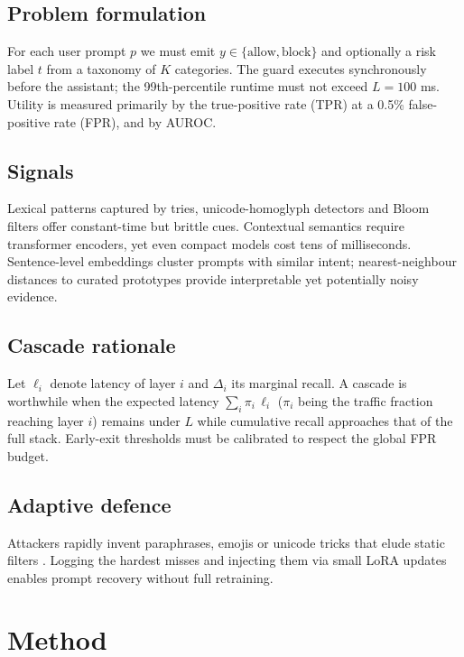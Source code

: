 \documentclass{article}
\begin{document}
\subsection{Problem formulation}
For each user prompt $p$ we must emit $y \in \{\text{allow}, \text{block}\}$ and optionally a risk label $t$ from a taxonomy of $K$ categories. The guard executes synchronously before the assistant; the 99th-percentile runtime must not exceed $L = 100$ ms. Utility is measured primarily by the true-positive rate (TPR) at a 0.5\% false-positive rate (FPR), and by AUROC.

\subsection{Signals}
Lexical patterns captured by tries, unicode-homoglyph detectors and Bloom filters offer constant-time but brittle cues. Contextual semantics require transformer encoders, yet even compact models cost tens of milliseconds. Sentence-level embeddings cluster prompts with similar intent; nearest-neighbour distances to curated prototypes provide interpretable yet potentially noisy evidence.

\subsection{Cascade rationale}
Let $\ell_i$ denote latency of layer $i$ and $\Delta_i$ its marginal recall. A cascade is worthwhile when the expected latency $\sum_i \pi_i \, \ell_i$ ($\pi_i$ being the traffic fraction reaching layer $i$) remains under $L$ while cumulative recall approaches that of the full stack. Early-exit thresholds must be calibrated to respect the global FPR budget.

\subsection{Adaptive defence}
Attackers rapidly invent paraphrases, emojis or unicode tricks that elude static filters \cite{liu-2023-autodan}. Logging the hardest misses and injecting them via small LoRA updates enables prompt recovery without full retraining.

\section{Method}
\end{document}
